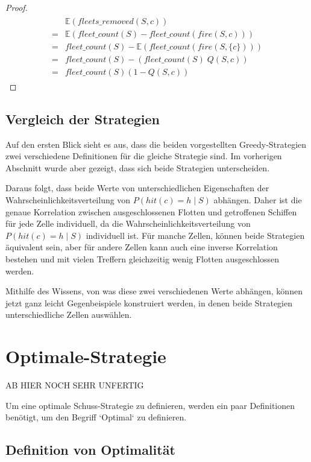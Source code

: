 \documentclass[a4paper,12pt]{llncs}
\numberwithin{equation}{section}
\begin{document}
\begin{proof}
\begin{align}
\begin{split}
&\mathds{E}(fleets\_removed(S,c))\\
=&\mathds{E}(fleet\_count(S) - fleet\_count(fire(S,c)))\\
=&fleet\_count(S) - \mathds{E}(fleet\_count(fire(S,\{c\})))\\
=&fleet\_count(S) - (fleet\_count(S)\; Q(S,c))\\
=&fleet\_count(S) (1 - Q(S,c))
\end{split}
\end{align}
\end{proof}

\subsection{Vergleich der Strategien}
Auf den ersten Blick sieht es aus, dass die beiden vorgestellten Greedy-Strategien zwei verschiedene Definitionen für die gleiche Strategie sind. Im vorherigen Abschnitt wurde aber gezeigt, dass sich beide Strategien unterscheiden.

Daraus folgt, dass beide Werte von unterschiedlichen Eigenschaften der Wahrscheinlichkeitsverteilung von $P(hit(c)=h \mid S)$ abhängen. Daher ist die genaue Korrelation zwischen ausgeschlossenen Flotten und getroffenen Schiffen für jede Zelle individuell, da die Wahrscheinlichkeitsverteilung von $P(hit(c)=h \mid S)$ individuell ist. Für manche Zellen, können beide Strategien äquivalent sein, aber für andere Zellen kann auch eine inverse Korrelation bestehen und mit vielen Treffern gleichzeitig wenig Flotten ausgeschlossen werden.

Mithilfe des Wissens, von was diese zwei verschiedenen Werte abhängen, können jetzt ganz leicht Gegenbeispiele konstruiert werden, in denen beide Strategien unterschiedliche Zellen auswählen.


\section{Optimale-Strategie}

AB HIER NOCH SEHR UNFERTIG

Um eine optimale Schuss-Strategie zu definieren, werden ein paar Definitionen benötigt, um den Begriff `Optimal` zu definieren.

\subsection{Definition von Optimalität}
\end{document}
